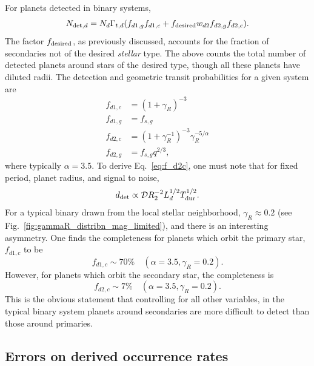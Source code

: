 \documentclass{emulateapj}
\begin{document}
For planets detected in binary systems,
\begin{equation}
N_{{\rm det},d}
= 
N_d \Gamma_{t,d} (f_{d1,g}f_{d1,c} + f_{\rm desired}w_{d2}f_{d2,g}f_{d2,c}).
\label{eq:N_det_d_model2}
\end{equation}
The factor $f_{\rm desired}$, as previously discussed, accounts for the 
fraction of secondaries not of the desired {\it stellar} type. The above 
counts the total number of detected planets around stars of the desired type, 
though all these planets have diluted radii.
The detection and geometric transit probabilities for a given system are
\begin{align}
f_{d1,c} &= (1+\gamma_R)^{-3} \\
f_{d1,g} &= f_{s,g} \\
f_{d2,c} &= (1+\gamma_R^{-1})^{-3} \gamma_R^{-5/\alpha} 
\label{eq:f_d2c}\\
f_{d2,g} &= f_{s,g}q^{2/3},
\end{align}
where typically $\alpha=3.5$.
To derive Eq.~\ref{eq:f_d2c}, one must note that for fixed period, planet 
radius, and signal to noise, 
$$d_{\rm det}\propto \mathcal{D} R_2^{-2} L_d^{1/2} T_{\rm dur}^{1/2}.$$
For a typical binary drawn from the local stellar neighborhood, $\gamma_R 
\approx 0.2$ (see Fig.~\ref{fig:gammaR_distribn_mag_limited}), and there is an 
interesting asymmetry.
One finds the completeness for planets which orbit the primary star, 
$f_{d1,c}$ to be
\begin{equation}
f_{d1,c} \sim 70\% \quad(\alpha=3.5, \gamma_R=0.2).
\end{equation}
However, for planets which orbit the secondary star, the completeness is
\begin{equation}
f_{d2,c} \sim 7\% \quad(\alpha=3.5, \gamma_R=0.2).
\end{equation}
This is the obvious statement that controlling for all other variables, 
in the typical binary system planets around secondaries are more difficult to 
detect than those around primaries.

\subsection{Errors on derived occurrence rates}
\end{document}
